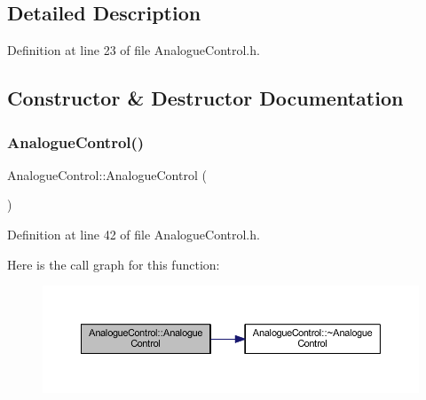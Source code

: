 \subsection{Detailed Description}


Definition at line 23 of file Analogue\+Control.\+h.



\subsection{Constructor \& Destructor Documentation}
\mbox{\label{class_analogue_control_aad4d11c644df1b2b31e32333aceb5d1a}} 
\subsubsection{\texorpdfstring{Analogue\+Control()}{AnalogueControl()}\hspace{0.1cm}{\footnotesize\ttfamily [1/3]}}
{\footnotesize\ttfamily Analogue\+Control\+::\+Analogue\+Control (\begin{DoxyParamCaption}{ }\end{DoxyParamCaption})\hspace{0.3cm}{\ttfamily [inline]}}



Definition at line 42 of file Analogue\+Control.\+h.

Here is the call graph for this function\+:
\nopagebreak
\begin{figure}[H]
\begin{center}
\leavevmode
\includegraphics[width=350pt]{class_analogue_control_aad4d11c644df1b2b31e32333aceb5d1a_cgraph}
\end{center}
\end{figure}
\mbox{\label{class_analogue_control_a58826c0582ce0697d1c03a92991a648c}} 
